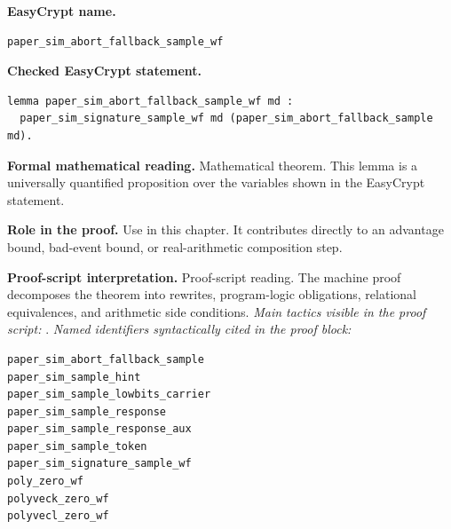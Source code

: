 \begin{formaltheorem}
\noindent\textbf{EasyCrypt name.}
\begin{lstlisting}[language=EasyCrypt,basicstyle=\ttfamily\scriptsize]
paper_sim_abort_fallback_sample_wf
\end{lstlisting}
\noindent\textbf{Checked EasyCrypt statement.}
\begin{lstlisting}[language=EasyCrypt,basicstyle=\ttfamily\scriptsize]
lemma paper_sim_abort_fallback_sample_wf md :
  paper_sim_signature_sample_wf md (paper_sim_abort_fallback_sample md).
\end{lstlisting}
\noindent\textbf{Formal mathematical reading.}
Mathematical theorem. This lemma is a universally quantified proposition over the variables shown in the EasyCrypt statement.

\noindent\textbf{Role in the proof.}
Use in this chapter. It contributes directly to an advantage bound, bad-event bound, or real-arithmetic composition step.

\noindent\textbf{Proof-script interpretation.}
Proof-script reading. The machine proof decomposes the theorem into rewrites, program-logic obligations, relational equivalences, and arithmetic side conditions.
\emph{Main tactics visible in the proof script:} .
\emph{Named identifiers syntactically cited in the proof block:}
\begin{lstlisting}[language=EasyCrypt,basicstyle=\ttfamily\scriptsize]
paper_sim_abort_fallback_sample
paper_sim_sample_hint
paper_sim_sample_lowbits_carrier
paper_sim_sample_response
paper_sim_sample_response_aux
paper_sim_sample_token
paper_sim_signature_sample_wf
poly_zero_wf
polyveck_zero_wf
polyvecl_zero_wf
\end{lstlisting}

\end{formaltheorem}

